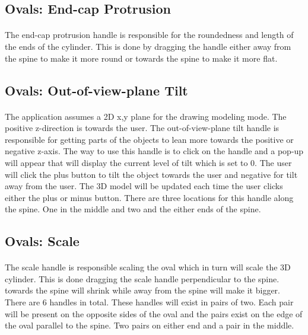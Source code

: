 \documentclass{report}
\begin{document}
\subsection*{Ovals: End-cap Protrusion}

\paragraph{} The end-cap protrusion handle is responsible for the roundedness and length of the ends of the cylinder. This is done by dragging the handle either away from the spine to make it more round or towards the spine to make it more flat.

\subsection*{Ovals: Out-of-view-plane Tilt}

\paragraph{} The application assumes a 2D x,y plane for the drawing modeling mode. The positive z-direction is towards the user. The out-of-view-plane tilt handle is responsible for getting parts of the objects to lean more towards the positive or negative z-axis. The way to use this handle is to click on the handle and a pop-up will appear that will display the current level of tilt which is set to 0. The user will click the plus button to tilt the object towards the user and negative for tilt away from the user. The 3D model will be updated each time the user clicks either the plus or minus button. There are three locations for this handle along the spine. One in the middle and two and the either ends of the spine.

\subsection*{Ovals: Scale}

\paragraph{} The scale handle is responsible scaling the oval which in turn will scale the 3D cylinder. This is done dragging the scale handle perpendicular to the spine. towards the spine will shrink while away from the spine will make it bigger. There are 6 handles in total. These handles will exist in pairs of two. Each pair will be present on the opposite sides of the oval and the pairs exist on the edge of the oval parallel to the spine. Two pairs on either end and a pair in the middle.
\end{document}
